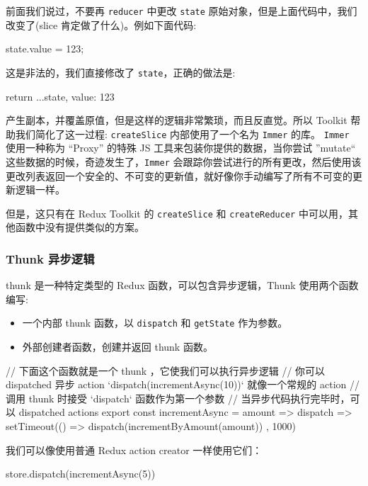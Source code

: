 前面我们说过，不要再 \texttt{reducer} 中更改 \texttt{state} 原始对象，但是上面代码中，我们改变了(slice 肯定做了什么)。例如下面代码:

\begin{JavaScript}
state.value = 123;
\end{JavaScript}

这是非法的，我们直接修改了 \texttt{state}，正确的做法是:

\begin{JavaScript}
return {
  ...state,
  value: 123
}
\end{JavaScript}

产生副本，并覆盖原值，但是这样的逻辑非常繁琐，而且反直觉。所以 Toolkit 帮助我们简化了这一过程: \texttt{createSlice} 内部使用了一个名为 \texttt{Immer} 的库。 \texttt{Immer} 使用一种称为 “Proxy” 的特殊 JS 工具来包装你提供的数据，当你尝试 ”mutate“ 这些数据的时候，奇迹发生了，\texttt{Immer} 会跟踪你尝试进行的所有更改，然后使用该更改列表返回一个安全的、不可变的更新值，就好像你手动编写了所有不可变的更新逻辑一样。

但是，这只有在 Redux Toolkit 的 \texttt{createSlice} 和 \texttt{createReducer} 中可以用，其他函数中没有提供类似的方案。

\subsubsection*{Thunk 异步逻辑}

thunk 是一种特定类型的 Redux 函数，可以包含异步逻辑，Thunk 使用两个函数编写:

\begin{itemize}
  \item 一个内部 thunk 函数，以 \texttt{dispatch} 和 \texttt{getState} 作为参数。
  \item 外部创建者函数，创建并返回 thunk 函数。
\end{itemize}

\begin{JavaScript}
// 下面这个函数就是一个 thunk ，它使我们可以执行异步逻辑
// 你可以 dispatched 异步 action `dispatch(incrementAsync(10))` 就像一个常规的 action
// 调用 thunk 时接受 `dispatch` 函数作为第一个参数
// 当异步代码执行完毕时，可以 dispatched actions
export const incrementAsync = amount => dispatch => {
  setTimeout(() => {
    dispatch(incrementByAmount(amount))
  }, 1000)
}
\end{JavaScript}

我们可以像使用普通 Redux action creator 一样使用它们：

\begin{JavaScript}
store.dispatch(incrementAsync(5))
\end{JavaScript}

